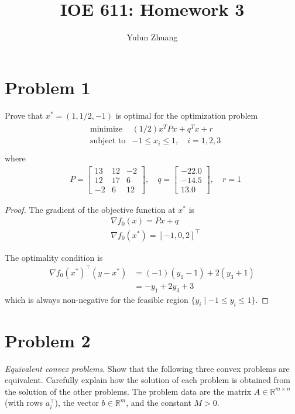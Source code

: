 \documentclass[11pt]{article}
\newcommand{\grad}{\nabla}
\newcommand{\RR}{\mathbb{R}}
\newcommand{\T}{^\top}
\begin{document}
\title{IOE 611: Homework 3}
\author{Yulun Zhuang}
\maketitle
\section*{Problem 1}
Prove that $x^* = (1, 1/2, -1)$ is optimal for the optimization problem
\begin{align*}
  &\begin{array}{ll}
  \text{minimize} & (1 / 2) x^T P x+q^T x+r \\
  \text {subject to} & -1 \leq x_i \leq 1, \quad i=1,2,3
  \end{array}\\
\end{align*}
where
\begin{align*}
  &P=\left[\begin{array}{rrr}
  13 & 12 & -2 \\
  12 & 17 & 6 \\
  -2 & 6 & 12
  \end{array}\right], \quad q=\left[\begin{array}{r}
  -22.0 \\
  -14.5 \\
  13.0
  \end{array}\right], \quad r=1
\end{align*}

\begin{proof}
  The gradient of the objective function at $x^*$ is
  \begin{align*}
    &\grad f_0(x) = P x + q\\
    &\grad f_0(x^*) = [-1, 0, 2]\T
  \end{align*}

  The optimality condition is
  \begin{align*}
      \nabla f_0(x^*)\T (y - x^*)
      &= (-1) (y_1 - 1) + 2 (y_3 + 1) \\
      &= -y_1 + 2y_3 + 3
  \end{align*}
  which is always non-negative for the feasible region $\{ y_i \mid -1 \leq y_i \leq 1 \}$.
\end{proof}




\clearpage
\section*{Problem 2}
\textit{Equivalent convex problems}.  Show that the following three convex problems are equivalent.
Carefully explain how the solution of each problem is obtained from the solution of
the other problems. The problem data are the matrix $A \in \RR^{m\times n}$ (with rows $a\T_i$), the vector $b \in\RR^m$, and the constant $M > 0$.
\end{document}

